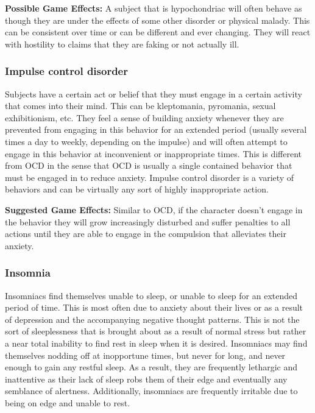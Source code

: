 \textbf{Possible Game Effects:} A subject that is hypochondriac will often behave as though they are under the effects of some other disorder or physical malady. This can be consistent over time or can be different and ever changing. They will react with hostility to claims that they are faking or not actually ill.

\subsubsection{Impulse control disorder}

Subjects have a certain act or belief that they must engage in a certain activity that comes into their mind. This can be kleptomania, pyromania, sexual exhibitionism, etc. They feel a sense of building anxiety whenever they are prevented from engaging in this behavior for an extended period (usually several times a day to weekly, depending on the impulse) and will often attempt to engage in this behavior at inconvenient or inappropriate times. This is different from OCD in the sense that OCD is usually a single contained behavior that must be engaged in to reduce anxiety. Impulse control disorder is a variety of behaviors and can be virtually any sort of highly inappropriate action.

\textbf{Suggested Game Effects:} Similar to OCD, if the character doesn’t engage in the behavior they will grow increasingly disturbed and suffer penalties to all actions until they are able to engage in the compulsion that alleviates their anxiety.

\subsubsection{Insomnia}

Insomniacs find themselves unable to sleep, or unable to sleep for an extended period of time. This is most often due to anxiety about their lives or as a result of depression and the accompanying negative thought patterns. This is not the sort of sleeplessness that is brought about as a result of normal stress but rather a near total inability to find rest in sleep when it is desired. Insomniacs may find themselves nodding off at inopportune times, but never for long, and never enough to gain any restful sleep. As a result, they are frequently lethargic and inattentive as their lack of sleep robs them of their edge and eventually any semblance of alertness. Additionally, insomniacs are frequently irritable due to being on edge and unable to rest.


